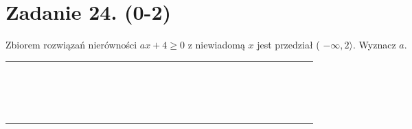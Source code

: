 \documentclass[10pt]{article}
\begin{document}
\section*{Zadanie 24. (0-2)}
Zbiorem rozwiązań nierówności \(a x+4 \geq 0\) z niewiadomą \(x\) jest przedział ( \(-\infty, 2\rangle\). Wyznacz \(a\).

\begin{center}
\begin{tabular}{|c|c|c|c|c|c|c|c|c|c|c|c|c|c|c|c|c|c|c|c|c|c|c|c|c|c|c|c|c|c|c|c|}
\hline
 &  &  &  &  &  &  &  &  &  &  &  &  &  &  &  &  &  &  &  &  &  &  &  &  &  &  &  &  &  &  &  \\
\hline
 &  &  &  &  &  &  &  &  &  &  &  &  &  &  &  &  &  &  &  &  &  &  &  &  &  &  &  &  &  &  &  \\
\hline
 &  &  &  &  &  &  &  &  &  &  &  &  &  &  &  &  &  &  &  &  &  &  &  &  &  &  &  &  &  &  &  \\
\hline
 &  &  &  &  &  &  &  &  &  &  &  &  &  &  &  &  &  &  &  &  &  &  &  &  &  &  &  &  &  &  &  \\
\hline
 &  &  &  &  &  &  &  &  &  &  &  &  &  &  &  &  &  &  &  &  &  &  &  &  &  &  &  &  &  &  &  \\
\hline
 &  &  &  &  &  &  &  &  &  &  &  &  &  &  &  &  &  &  &  &  &  &  &  &  &  &  &  &  &  &  &  \\
\hline
 &  &  &  &  &  &  &  &  &  &  &  &  &  &  &  &  &  &  &  &  &  &  &  &  &  &  &  &  &  &  &  \\
\hline
 &  &  &  &  &  &  &  &  &  &  &  &  &  &  &  &  &  &  &  &  &  &  &  &  &  &  &  &  &  &  &  \\
\hline
 &  &  &  &  &  &  &  &  &  &  &  &  &  &  &  &  &  &  &  &  &  &  &  &  &  &  &  &  &  &  &  \\
\hline
 &  &  &  &  &  &  &  &  &  &  &  &  &  &  &  &  &  &  &  &  &  &  &  &  &  &  &  &  &  &  &  \\
\hline
 &  &  &  &  &  &  &  &  &  &  &  &  &  &  &  &  &  &  &  &  &  &  &  &  &  &  &  &  &  &  &  \\
\hline
 &  &  &  &  &  &  &  &  &  &  &  &  &  &  &  &  &  &  &  &  &  &  &  &  &  &  &  &  &  &  &  \\
\hline
 &  &  &  &  &  &  &  &  &  &  &  &  &  &  &  &  &  &  &  &  &  &  &  &  &  &  &  &  &  &  &  \\
\hline
 &  &  &  &  &  &  &  &  &  &  &  &  &  &  &  &  &  &  &  &  &  &  &  &  &  &  &  &  &  &  &  \\
\hline
 &  &  &  &  &  &  &  &  &  &  &  &  &  &  &  &  &  &  &  &  &  &  &  &  &  &  &  &  &  &  &  \\
\hline
 &  &  &  &  &  &  &  &  &  &  &  &  &  &  &  &  &  &  &  &  &  &  &  &  &  &  &  &  &  &  &  \\
\hline
 &  &  &  &  &  &  &  &  &  &  &  &  &  &  &  &  &  &  &  &  &  &  &  &  &  &  &  &  &  &  &  \\
\hline
 &  &  &  &  &  &  &  &  &  &  &  &  &  &  &  &  &  &  &  &  &  &  &  &  &  &  &  &  &  &  &  \\
\hline
\end{tabular}
\end{center}
\end{document}
